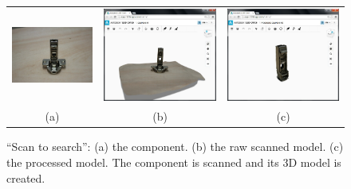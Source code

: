 \begin{figure}
\begin{center}
\begin{tabular}{ccc}   %
   \includegraphics[height=0.23\columnwidth]{input_component_photo_scantosearch_test}& 
   \includegraphics[height=0.23\columnwidth]{input_component_rawscanned_scantosearch_test}&
   \includegraphics[height=0.23\columnwidth]{input_component_scanned_scantosearch_test}\\
   (a) & (b) & (c)
\end{tabular}
\caption{``Scan to search'': (a) the component. (b) the raw scanned model. (c) the processed model. The component is scanned and its 3D model is created. } 
  \label{scantosearchtest_component_scanning}
\end{center}
\end{figure}


